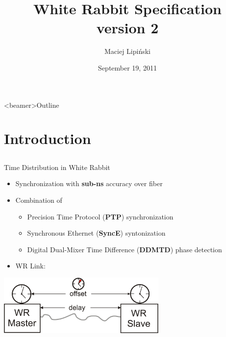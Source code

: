 \documentclass[compress,red]{beamer}
\title[White Rabbit Specification\hspace{2em}\insertframenumber/ \inserttotalframenumber]
{White Rabbit Specification \\ version 2}
\institute{
$5^{th}$ White Rabbit Workshop \\ CERN
}
\author{
Maciej Lipi\'{n}ski %
}
\date{September 19, 2011}
\begin{document}
\frame{\titlepage}
\begin{frame}<beamer>{Outline}

    \tableofcontents %

\end{frame}
\section{Introduction}
\subsection{}
\begin{frame}{Time Distribution in White Rabbit}

  \begin{itemize}
    \item Synchronization with {\bf sub-ns} accuracy over fiber
    \item Combination of
	\begin{itemize}
	  \item Precision Time Protocol ({\bf PTP}) synchronization
	  \item Synchronous Ethernet ({\bf SyncE}) syntonization
	  \item Digital Dual-Mixer Time Difference ({\bf DDMTD}) phase detection
	\end{itemize}
    \item WR Link:
  \end{itemize}

  \begin{center}
  \includegraphics[height=3cm]{protocol/wrLink.pdf}
  \end{center}

\end{frame}
\end{document}
